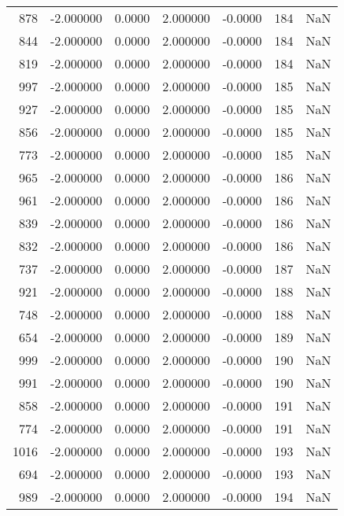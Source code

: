 \begin{tabular}{rrrrrrr}
 878 &   -2.000000 &    0.0000 &    2.000000 &     -0.0000 &         184 & NaN \\
 844 &   -2.000000 &    0.0000 &    2.000000 &     -0.0000 &         184 & NaN \\
 819 &   -2.000000 &    0.0000 &    2.000000 &     -0.0000 &         184 & NaN \\
 997 &   -2.000000 &    0.0000 &    2.000000 &     -0.0000 &         185 & NaN \\
 927 &   -2.000000 &    0.0000 &    2.000000 &     -0.0000 &         185 & NaN \\
 856 &   -2.000000 &    0.0000 &    2.000000 &     -0.0000 &         185 & NaN \\
 773 &   -2.000000 &    0.0000 &    2.000000 &     -0.0000 &         185 & NaN \\
 965 &   -2.000000 &    0.0000 &    2.000000 &     -0.0000 &         186 & NaN \\
 961 &   -2.000000 &    0.0000 &    2.000000 &     -0.0000 &         186 & NaN \\
 839 &   -2.000000 &    0.0000 &    2.000000 &     -0.0000 &         186 & NaN \\
 832 &   -2.000000 &    0.0000 &    2.000000 &     -0.0000 &         186 & NaN \\
 737 &   -2.000000 &    0.0000 &    2.000000 &     -0.0000 &         187 & NaN \\
 921 &   -2.000000 &    0.0000 &    2.000000 &     -0.0000 &         188 & NaN \\
 748 &   -2.000000 &    0.0000 &    2.000000 &     -0.0000 &         188 & NaN \\
 654 &   -2.000000 &    0.0000 &    2.000000 &     -0.0000 &         189 & NaN \\
 999 &   -2.000000 &    0.0000 &    2.000000 &     -0.0000 &         190 & NaN \\
 991 &   -2.000000 &    0.0000 &    2.000000 &     -0.0000 &         190 & NaN \\
 858 &   -2.000000 &    0.0000 &    2.000000 &     -0.0000 &         191 & NaN \\
 774 &   -2.000000 &    0.0000 &    2.000000 &     -0.0000 &         191 & NaN \\
1016 &   -2.000000 &    0.0000 &    2.000000 &     -0.0000 &         193 & NaN \\
 694 &   -2.000000 &    0.0000 &    2.000000 &     -0.0000 &         193 & NaN \\
 989 &   -2.000000 &    0.0000 &    2.000000 &     -0.0000 &         194 & NaN \\

\end{tabular}
